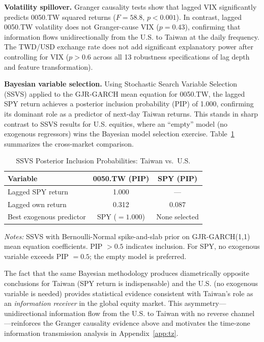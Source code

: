 \textbf{Volatility spillover.} Granger causality tests show that lagged VIX significantly predicts 0050.TW squared returns ($F = 58.8$, $p < 0.001$). In contrast, lagged 0050.TW volatility does not Granger-cause VIX ($p = 0.43$), confirming that information flows unidirectionally from the U.S. to Taiwan at the daily frequency. The TWD/USD exchange rate does not add significant explanatory power after controlling for VIX ($p > 0.6$ across all 13 robustness specifications of lag depth and feature transformation).%

\textbf{Bayesian variable selection.} Using Stochastic Search Variable Selection (SSVS) applied to the GJR-GARCH mean equation for 0050.TW, the lagged SPY return achieves a posterior inclusion probability (PIP) of 1.000, confirming its dominant role as a predictor of next-day Taiwan returns. This stands in sharp contrast to SSVS results for U.S. equities, where an ``empty'' model (no exogenous regressors) wins the Bayesian model selection exercise. Table~\ref{tab:ssvs_pip} summarizes the cross-market comparison.

\begin{table}[H]
\centering
\caption{SSVS Posterior Inclusion Probabilities: Taiwan vs.\ U.S.}
\label{tab:ssvs_pip}
\begin{tabular}{lcc}
\toprule
Variable & 0050.TW (PIP) & SPY (PIP) \\
\midrule
Lagged SPY return & 1.000 & --- \\
Lagged own return & 0.312 & 0.087 \\
Best exogenous predictor & SPY ($= 1.000$) & None selected \\
\bottomrule
\end{tabular}
\begin{flushleft}
\small \textit{Notes:} SSVS with Bernoulli-Normal spike-and-slab prior on GJR-GARCH(1,1) mean equation coefficients. PIP $> 0.5$ indicates inclusion. For SPY, no exogenous variable exceeds PIP $= 0.5$; the empty model is preferred.
\end{flushleft}
\end{table}

The fact that the same Bayesian methodology produces diametrically opposite conclusions for Taiwan (SPY return is indispensable) and the U.S. (no exogenous variable is needed) provides statistical evidence consistent with Taiwan's role as an \textit{information receiver} in the global equity market. This asymmetry---unidirectional information flow from the U.S. to Taiwan with no reverse channel---reinforces the Granger causality evidence above and motivates the time-zone information transmission analysis in Appendix~\ref{app:tz}.

